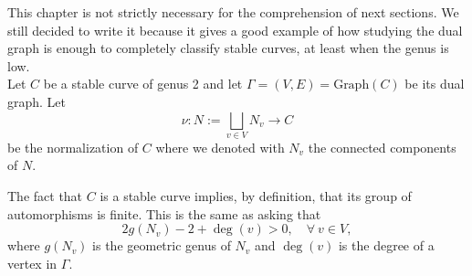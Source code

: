 \documentclass[a4paper,12 pt,titlepage,twoside]{book}
\theoremstyle{plain}
\theoremstyle{theorem}
\theoremstyle{definition}
\theoremstyle{remark}
\begin{document}
	This chapter is not strictly necessary for the comprehension of next sections. We still decided to write it because it gives a good example of how studying the dual graph is enough to completely classify stable curves, at least when the genus is low.\\
	
	Let $C$ be a stable curve of genus 2 and let $\Gamma =(V,E) = \text{Graph}(C)$ be its dual graph. Let $$\nu \colon N:= \bigsqcup_{v \in V} N_v \rightarrow C$$ be the normalization of $C$ where we denoted with $N_v$ the connected components of $N$.
	 
	The fact that $C$ is a stable curve implies, by definition, that its group of automorphisms is finite. This is the same as asking that $$2g(N_v) -2 + \deg(v) >0, \quad \forall \ v \in V,$$ where $g(N_v)$ is the geometric genus of $N_v$ and $\deg(v)$ is the degree of a vertex in $\Gamma$.
	
\end{document}
